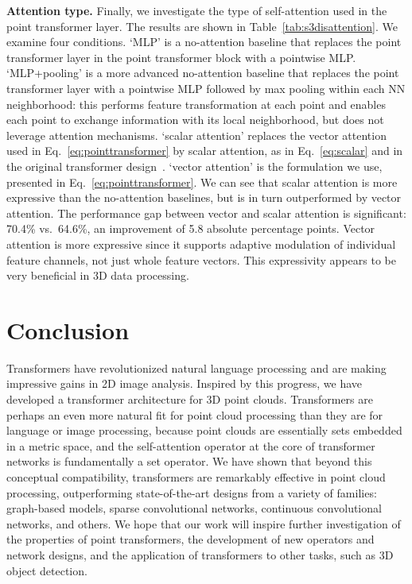 \documentclass[final]{cvpr}
\newcommand\mypara[1]{\vspace{1mm}\noindent\textbf{#1}}
\begin{document}
\mypara{Attention type.}
Finally, we investigate the type of self-attention used in the point transformer layer. The results are shown in Table~\ref{tab:s3disattention}. We examine four conditions. `MLP' is a no-attention baseline that replaces the point transformer layer in the point transformer block with a pointwise MLP. `MLP+pooling' is a more advanced no-attention baseline that replaces the point transformer layer with a pointwise MLP followed by max pooling within each NN neighborhood: this performs feature transformation at each point and enables each point to exchange information with its local neighborhood, but does not leverage attention mechanisms.
`scalar attention' replaces the vector attention used in Eq.~\ref{eq:pointtransformer} by scalar attention, as in Eq.~\ref{eq:scalar} and in the original transformer design~\cite{vaswani2017attention}. `vector attention' is the formulation we use, presented in Eq.~\ref{eq:pointtransformer}. We can see that scalar attention is more expressive than the no-attention baselines, but is in turn outperformed by vector attention. The performance gap between vector and scalar attention is significant: 70.4\% vs.\ 64.6\%, an improvement of 5.8 absolute percentage points. Vector attention is more expressive since it supports adaptive modulation of individual feature channels, not just whole feature vectors. This expressivity appears to be very beneficial in 3D data processing.
 
\section{Conclusion}
\label{sec:conclusion}
Transformers have revolutionized natural language processing and are making impressive gains in 2D image analysis. Inspired by this progress, we have developed a transformer architecture for 3D point clouds. Transformers are perhaps an even more natural fit for point cloud processing than they are for language or image processing, because point clouds are essentially sets embedded in a metric space, and the self-attention operator at the core of transformer networks is fundamentally a set operator. We have shown that beyond this conceptual compatibility, transformers are remarkably effective in point cloud processing, outperforming state-of-the-art designs from a variety of families: graph-based models, sparse convolutional networks, continuous convolutional networks, and others. We hope that our work will inspire further investigation of the properties of point transformers, the development of new operators and network designs, and the application of transformers to other tasks, such as 3D object detection. 
\balance

{\small


}
\end{document}
